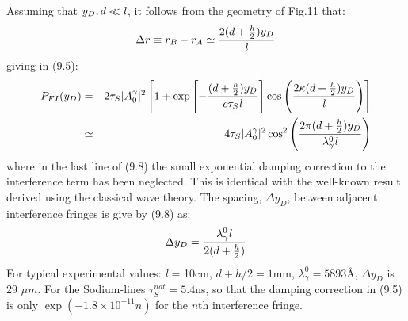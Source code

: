 \documentclass [12pt]{article}
\begin{document}
{\begin{equation}
  \end{equation}
   Assuming that $y_D, d \ll  {\it l}$, it follows from the geometry of Fig.11 that:
   \begin{equation}
  \Delta r \equiv  r_B-r_A \simeq \frac{2(d +\frac{h}{2})y_D}{{\it l}}
   \end{equation}
   giving in (9.5):
    \begin{eqnarray}
   P_{FI}(y_D) & = & 2 \tau_S |A_0^{\gamma}|^2\left[1+\exp\left[-\frac{(d +\frac{h}{2})y_D}{c \tau_S {\it l}}\right]
   \cos \left(\frac{2\kappa(d +\frac{h}{2})y_D}{{\it l}}\right)\right]     \nonumber \\
     & \simeq &  4 \tau_S |A_0^{\gamma}|^2 \cos^2 \left( \frac{2 \pi (d +\frac{h}{2})y_D}{\lambda_{\gamma}^0 {\it l}}
    \right)
 \end{eqnarray}
  where in the last line of (9.8) the small exponential damping correction to the interference term has
  been neglected. This is identical with the well-known result derived using the classical wave theory.
  The spacing, $\Delta y_D$, between adjacent interference fringes is give by (9.8) as:
   \begin{equation}
  \Delta y_D = \frac{\lambda_{\gamma}^0 {\it l}}{2(d +\frac{h}{2})}
   \end{equation}  
    For typical experimental values: {\it l } = 10cm, $d+h/2 = 1$mm, $\lambda_{\gamma}^0 = 5893$\AA, $\Delta y_D$ is
    29 $\mu m$. For the Sodium-lines $\tau^{nat}_S = 5.4$ns, so that the damping correction in (9.5)
    is only $\exp(-1.8 \times 10^{-11} n)$ for the $n$th interference fringe.

}
\end{document}
